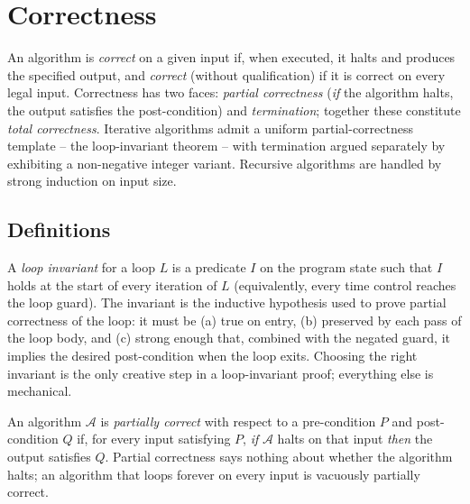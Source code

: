 \section{Correctness}
\label{sec:correctness}

An algorithm is \emph{correct} on a given input if, when executed, it halts and produces the specified output, and \emph{correct} (without qualification) if it is correct on every legal input. Correctness has two faces: \emph{partial correctness} (\emph{if} the algorithm halts, the output satisfies the post-condition) and \emph{termination}; together these constitute \emph{total correctness}. Iterative algorithms admit a uniform partial-correctness template -- the loop-invariant theorem -- with termination argued separately by exhibiting a non-negative integer variant. Recursive algorithms are handled by strong induction on input size.

\subsection{Definitions}

\begin{definition}
\label{def:loop_invariant}
A \emph{loop invariant} for a loop $L$ is a predicate $I$ on the program state such that $I$ holds at the start of every iteration of $L$ (equivalently, every time control reaches the loop guard). The invariant is the inductive hypothesis used to prove partial correctness of the loop: it must be (a) true on entry, (b) preserved by each pass of the loop body, and (c) strong enough that, combined with the negated guard, it implies the desired post-condition when the loop exits. Choosing the right invariant is the only creative step in a loop-invariant proof; everything else is mechanical.
\end{definition}

\begin{definition}
\label{def:partial_correctness}
An algorithm $\mathcal{A}$ is \emph{partially correct} with respect to a pre-condition $P$ and post-condition $Q$ if, for every input satisfying $P$, \emph{if} $\mathcal{A}$ halts on that input \emph{then} the output satisfies $Q$. Partial correctness says nothing about whether the algorithm halts; an algorithm that loops forever on every input is vacuously partially correct.
\end{definition}

